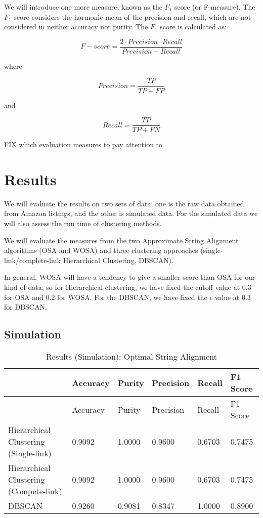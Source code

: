 \documentclass[]{article}
\begin{document}
We will introduce one more measure, known as the \(F_{1}\) score (or
F-measure). The \(F_{1}\) score considers the harmonic mean of the
precision and recall, which are not considered in neither accuracy nor
purity. The \(F_{1}\) score is calculated as:

\[
F-score = \frac{2 \cdot Precision \cdot Recall}{Precision + Recall}
\]

where

\[
Precision = \frac{TP}{TP + FP} 
\]

and

\[
Recall = \frac{TP}{TP + FN} 
\]

FIX which evaluation measures to pay attention to

\section{Results}\label{results}

We will evaluate the results on two sets of data; one is the raw data
obtained from Amazon listings, and the other is simulated data. For the
simulated data we will also assess the run time of clustering methods.

We will evaluate the measures from the two Approximate String Alignment
algorithms (OSA and WOSA) and three clustering approaches
(single-link/complete-link Hierarchical Clustering, DBSCAN).

In general, WOSA will have a tendency to give a smaller score than OSA
for our kind of data, so for Hierarchical clustering, we have fixed the
cutoff value at 0.3 for OSA and 0.2 for WOSA. For the DBSCAN, we have
fixed the \(\epsilon\) value at 0.3 for DBSCAN.

\subsection{Simulation}\label{simulation}

\begin{longtable}[]{@{}llllll@{}}
\caption{Results (Simulation): Optimal String Alignment}\tabularnewline
\toprule
& Accuracy & Purity & Precision & Recall & F1 Score\tabularnewline
\midrule
\endfirsthead
\toprule
& Accuracy & Purity & Precision & Recall & F1 Score\tabularnewline
\midrule
\endhead
Hierarchical Clustering (Single-link) & 0.9092 & 1.0000 & 0.9600 &
0.6703 & 0.7475\tabularnewline
Hierarchical Clustering (Compete-link) & 0.9092 & 1.0000 & 0.9600 &
0.6703 & 0.7475\tabularnewline
DBSCAN & 0.9260 & 0.9081 & 0.8347 & 1.0000 & 0.8900\tabularnewline
\bottomrule
\end{longtable}
\end{document}
